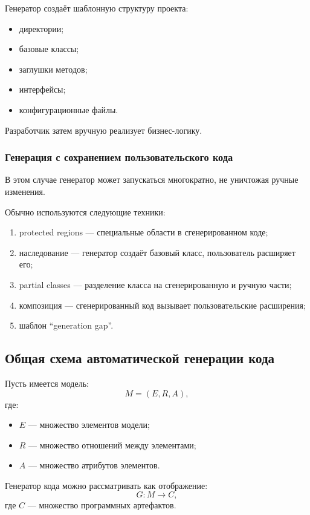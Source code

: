 \documentclass[12pt,a4paper]{article}
\begin{document}
Генератор создаёт шаблонную структуру проекта:

\begin{itemize}
    \item директории;
    \item базовые классы;
    \item заглушки методов;
    \item интерфейсы;
    \item конфигурационные файлы.
\end{itemize}

Разработчик затем вручную реализует бизнес-логику.

\subsubsection{Генерация с сохранением пользовательского кода}

В этом случае генератор может запускаться многократно, не уничтожая ручные изменения.

Обычно используются следующие техники:

\begin{enumerate}
    \item protected regions --- специальные области в сгенерированном коде;
    \item наследование --- генератор создаёт базовый класс, пользователь расширяет его;
    \item partial classes --- разделение класса на сгенерированную и ручную части;
    \item композиция --- сгенерированный код вызывает пользовательские расширения;
    \item шаблон ``generation gap''.
\end{enumerate}

\subsection{Общая схема автоматической генерации кода}

Пусть имеется модель:
\[
    M = (E, R, A),
\]
где:
\begin{itemize}
    \item $E$ --- множество элементов модели;
    \item $R$ --- множество отношений между элементами;
    \item $A$ --- множество атрибутов элементов.
\end{itemize}

Генератор кода можно рассматривать как отображение:
\[
    G: M \rightarrow C,
\]
где $C$ --- множество программных артефактов.
\end{document}
